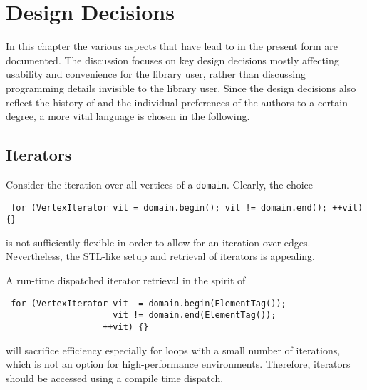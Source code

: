 \chapter{Design Decisions} \label{chap:design}

In this chapter the various aspects that have lead to {\ViennaGrid} in the present form are documented.
The discussion focuses on key design decisions mostly affecting usability and convenience for the library user,
rather than discussing programming details invisible to the library user. Since the design decisions also reflect
the history of {\ViennaGrid} and the individual preferences of the authors to a certain degree, a more vital language is chosen in the following.

 \section{Iterators}
 Consider the iteration over all vertices of a \lstinline|domain|. Clearly, the choice
 \begin{lstlisting}
 for (VertexIterator vit = domain.begin(); vit != domain.end(); ++vit) {}
 \end{lstlisting}
 is not sufficiently flexible in order to allow for an iteration over edges.
 Nevertheless, the STL-like setup and retrieval of iterators is appealing.

 A run-time dispatched iterator retrieval in the spirit of 
 \begin{lstlisting}
 for (VertexIterator vit  = domain.begin(ElementTag());
                     vit != domain.end(ElementTag());
                   ++vit) {}
 \end{lstlisting}
 will sacrifice efficiency especially for loops with a small number of iterations, which is not an option for high-performance environments. 
 Therefore, iterators should be accessed using a compile time dispatch.

